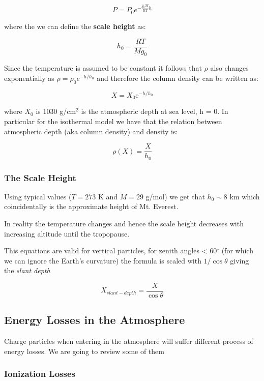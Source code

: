 \documentclass[
  letterpaper,
  DIV=11,
  numbers=noendperiod]{scrreprt}
\begin{document}
\[P = P_0 e^{-\frac{g_0 M}{R T} h} \]

where the we can define the \textbf{scale height} as:

\[ h_0 = \frac{R T}{M g_0} \]

Since the temperature is assumed to be constant it follows that \(\rho\)
also changes exponentially as \(\rho = \rho_0 e^{-h/h_0}\) and therefore
the column density can be written as:

\[X = X_0 \mathrm{ e}^{-h/h_0}\]

where \(X_0\) is 1030 g/cm\(^{2}\) is the atmospheric depth at sea
level, h = 0. In particular for the isothermal model we have that the
relation between atmospheric depth (aka column density) and density is:

\[ \rho(X) = \frac{X}{h_0} \]

\subsubsection*{The Scale Height}\label{the-scale-height}

Using typical values (\(T = 273\) K and \(M = 29\) g/mol) we get that
\(h_0 \sim 8\) km which coincidentally is the approximate height of Mt.
Everest.

In reality the temperature changes and hence the scale height decreases
with increasing altitude until the tropopause.

This equations are valid for vertical particles, for zenith angles
\textless{} 60\(^\circ\) (for which we can ignore the Earth's curvature)
the formula is scaled with \(1/\cos{\theta}\) giving the \emph{slant
depth}

\[X_{slant-depth} = \frac{X}{\cos \theta} \]

\subsection*{Energy Losses in the
Atmosphere}\label{energy-losses-in-the-atmosphere}

Charge particles when entering in the atmosphere will suffer different
process of energy losses. We are going to review some of them

\subsubsection*{Ionization Losses}\label{ionization-losses}
\end{document}
